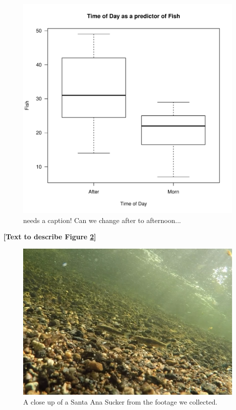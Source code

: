 \documentclass{article}\usepackage[]{graphicx}\usepackage[]{color}
\makeatletter
\def\maxwidth{ %
  \ifdim\Gin@nat@width>\linewidth
    \linewidth
  \else
    \Gin@nat@width
  \fi
}
\newenvironment{knitrout}{}{} %
\makeatother
\begin{document}
\begin{figure}[!ht]
\begin{knitrout}
\color{fgcolor}
\includegraphics[width=\maxwidth]{figure/unnamed-chunk-7-1} 

\end{knitrout}
\caption{needs a caption! Can we change after to afternoon...}
\label{fig:fishsection}
\end{figure}


\textbf{[Text to describe Figure \ref{fig:reallygoodcrop}]}

\begin{figure}
\includegraphics[scale=.4]{Videography_figures/reallygoodcrop}
\caption{A close up of a Santa Ana Sucker from the footage we collected.}
\label{fig:reallygoodcrop}
\end{figure}
\end{document}
